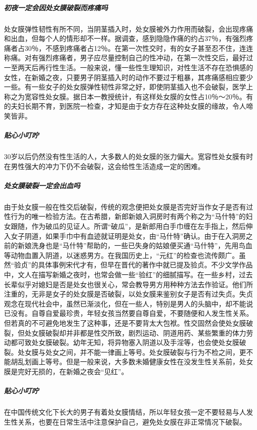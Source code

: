\begin{enumerate}
\subparagraph{初夜一定会因处女膜破裂而疼痛吗}

处女膜弹性韧性有所不同，当阴茎插入时，处女膜被外力作用而破裂，会出现疼痛和出血，但每个人的情形却不一样。据调查，感到隐隐作痛的约占37％，有强烈疼痛者占30％，不感到疼痛者占12％。在第一次性交时，有的女子甚至忍不住，连连称痛。对有强烈疼痛者，男子应尽量控制自己的性冲动，在第一次性交后，最好过一至两天后再行性生活。一般来说，懂一些性生理知识，对性生活不存在恐惧感的女性，在新婚之夜，只要男子阴茎插入时的动作不要过于粗暴，其疼痛感相应要少一些。有一些女子的处女膜弹性韧性非常之好，即使阴茎插入也不会破裂，医学上称之为宽容性处女膜。据日本一教授统计，有这样处女膜的女性占10％～20％。有的夫妇长期不育，到医院一检查，才知是由于女方存在这种处女膜的缘故，令人啼笑皆非。

\subparagraph{贴心小叮咛}

30岁以后仍然没有性生活的人，大多数人的处女膜的张力偏大。宽容性处女膜有时在男性强大的冲力下仍不会破裂，这会给性生活造成一定的困难。

\subparagraph{处女膜破裂一定会出血吗}

由于处女膜一般在性交后破裂，传统的观念便把处女膜是否完好当作女子是否有过性行为的唯一检验方法。在古希腊，新郎新娘入洞房时有两个称之为“马什特”的妇女跟随，作为破瓜的见证人。所谓“破瓜”，是新郎用白手巾缠在左手指上，然后伸入女子阴道，如果手巾中有血迹就证明是处女，由“马什特”确认。由于在入洞房之前的新娘洗身也是“马什特”帮助的，一些已失身的姑娘便买通“马什特”，先用鸟血等动物血置入阴道，以迷惑男方。在我国历史上，“元红”的检查也流传颇广。虽然“验贞”的具体事例宋代才有，但早在晋代的著作中就已提及验贞。不少文学作品中，文人在描写新婚之夜时，也常会做一些“验红”的细腻描写。在一些乡村，过去长辈似乎对媳妇是否是处女也很关心，常会教导男方用种种方法去作验证。他们所注重的，无非是女子的处女膜是否破裂，以处女膜来鉴别女子是否有过失贞。失贞观念在现代社会中，虽然已渐淡化，但在一些人，特别是男人的头脑中，却不能说已没有。自尊自爱最珍贵，年轻女孩当然要自尊自爱，不要随便和人发生性关系。但若真的不可避免地发生了这种事，还是不要背太大包袱。性交固然会使处女膜破裂，但处女膜破裂却并非都是性交所致，剧烈运动、阴道用药、某些繁重的体力劳动都可致处女膜破裂。幼年无知，将异物塞入阴道以及手淫等，也会使处女膜破裂。处女膜与处女之间，并不能一律画上等号。处女膜破裂与行为不检之间，更不能胡乱划画上等号。但是一般来说，大多数未婚健康女性在没发生性关系前，处女膜是完好无损的，在新婚之夜会“见红”。

\subparagraph{贴心小叮咛}

在中国传统文化下长大的男子有着处女膜情结，所以年轻女孩一定不要轻易与人发生性关系，也要在日常生活中注意保护自己，避免处女膜在非正常情况下破裂。


\end{enumerate}
